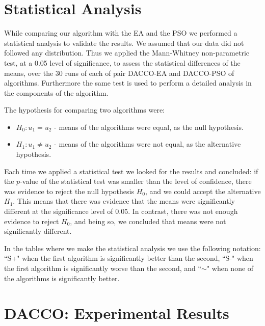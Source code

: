 \section{Statistical Analysis}
\label{sec:statistical_analysis}
While comparing our algorithm with the EA and the PSO we performed a statistical analysis to validate the results. We assumed that our data did not followed any distribution. Thus we applied the Mann-Whitney non-parametric test, at a 0.05 level of significance, to assess the statistical differences of the means, over the 30 runs of each of pair DACCO-EA and DACCO-PSO of algorithms. Furthermore the same test is used to perform a detailed analysis in the components of the algorithm.

The hypothesis for comparing two algorithms were:
\begin{itemize}
	\item $H_{0} : u_1 = u_2$ - means of the algorithms were equal, as the null hypothesis.
	\item $H_{1} : u_1 \neq u_2$ - means of the algorithms were not equal, as the alternative hypothesis.
\end{itemize}

Each time we applied a statistical test we looked for the results and concluded: if the $p$-value of the statistical test was smaller than the level of confidence, there was evidence to reject the null hypothesis $H_{0}$, and we could accept the alternative $H_{1}$. This means that there was evidence that the means were significantly different  at the significance level of 0.05. In contrast, there was not enough evidence to reject $H_{0}$, and being so, we concluded that means were not significantly different.

In the tables where we make the statistical analysis we use the following notation: ``S+" when the first algorithm is significantly better than the second, ``S-" when the first algorithm is significantly worse than the second, and ``$\sim$" when none of the algorithms is significantly better.



\section{DACCO: Experimental Results}
\label{sec:experimental_results}
	
